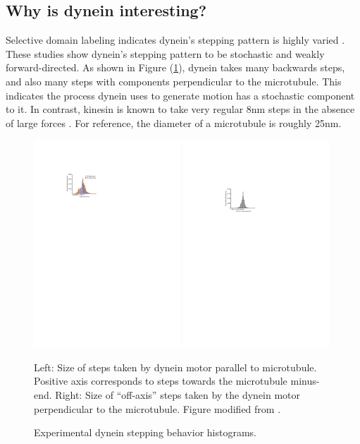 \documentclass[
11pt, %
english, %
singlespacing, %
headsepline, %
chapterinoneline, %
]{MastersDoctoralThesis} %
\begin{document}
\subsection{Why is dynein interesting?}
Selective domain labeling indicates dynein's stepping pattern is highly varied \cite{reck2006single, weihongpaper}. These studies show dynein's stepping pattern to be stochastic and weakly forward-directed. As shown in Figure (\ref{fig:weihong-steps}), dynein takes many backwards steps, and also many steps with components perpendicular to the microtubule. This indicates the process dynein uses to generate motion has a stochastic component to it. In contrast, kinesin is known to take very regular 8nm steps in the absence of large forces \cite{kinesin-step-size}. For reference, the diameter of a microtubule is roughly 25nm.\\

\begin{figure}[h!]
  \centering
  \includegraphics[width=0.49\textwidth]{../figures/weihong-step-size}
  \includegraphics[width=0.49\textwidth]{../figures/weihong-off-axis-steps}
    \caption{Experimental dynein stepping behavior histograms.}{Left: Size of steps taken by dynein motor parallel to microtubule. Positive axis corresponds to steps towards the microtubule minus-end. Right: Size of ``off-axis'' steps taken by the dynein motor perpendicular to the microtubule. Figure modified from \cite{weihongpaper}.}
  \label{fig:weihong-steps}
\end{figure}
\end{document}
